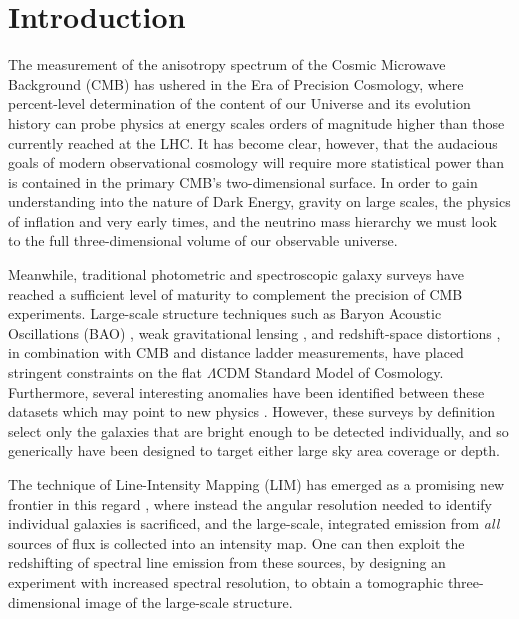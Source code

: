 \chapter{\label{chap:intro} Introduction}

The measurement of the anisotropy spectrum of the Cosmic Microwave Background (CMB) has ushered in the Era of Precision Cosmology, where percent-level determination of the content of our Universe and its evolution history can probe physics at energy scales orders of magnitude higher than those currently reached at the LHC. \citep{planckcosmo, planckxbicep} It has become clear, however, that the audacious goals of modern observational cosmology will require more statistical power than is contained in the primary CMB's two-dimensional surface. In order to gain understanding into the nature of Dark Energy, gravity on large scales, the physics of inflation and very early times, and the neutrino mass hierarchy we must look to the full three-dimensional volume of our observable universe. 

Meanwhile, traditional photometric and spectroscopic galaxy surveys have reached a sufficient level of maturity to complement the precision of CMB experiments. Large-scale structure techniques such as Baryon Acoustic Oscillations (BAO) \citep{boss}, weak gravitational lensing \citep{cfhtlens, kids450}, and redshift-space distortions \citep{rsd}, in combination with CMB and distance ladder measurements, have placed stringent constraints on the flat $\Lambda$CDM Standard Model of Cosmology. Furthermore, several interesting anomalies have been identified between these datasets which may point to new physics \citep{planckcosmo, h0}. However, these surveys by definition select only the galaxies that are bright enough to be detected individually, and so generically have been designed to target either large sky area coverage or depth.

The technique of Line-Intensity Mapping (LIM) has emerged as a promising new frontier in this regard \citep{statusreport}, where instead the angular resolution needed to identify individual galaxies is sacrificed, and the large-scale, integrated emission from \textit{all} sources of flux is collected into an intensity map. One can then exploit the redshifting of spectral line emission from these sources, by designing an experiment with increased spectral resolution, to obtain a tomographic three-dimensional image of the large-scale structure.

